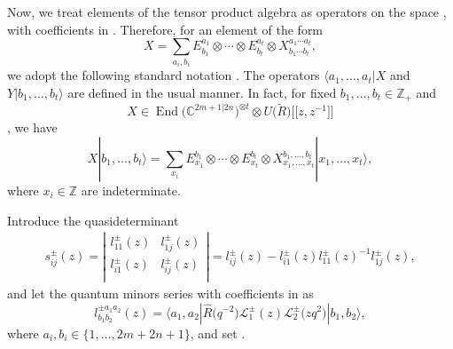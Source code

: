 \documentclass[pdftex]{sigma}
\numberwithin{equation}{section}
\begin{document}
 Now, we treat elements of the tensor product algebra
 as operators on the space , with coefficients in .
Therefore, for an element of the form
\begin{equation*}
 X = \sum\limits_{a_i,b_i} E^{a_1}_{b_1} \otimes \cdots \otimes E^{a_t}_{b_t} \otimes X^{a_1 \cdots a_t}_{b_1 \cdots b_t},
\end{equation*}
we adopt the following standard notation
.
The operators $\langle a_1, \ldots, a_t | X$ and $Y | b_1, \ldots, b_t \rangle$ are defined in the usual manner.
In fact, for fixed $b_1, \ldots, b_t \in \mathbb{Z}_+$ and \[X \in \operatorname{End}\bigl(\mathbb{C}^{2m+1|2n}\bigr)^{\otimes t} \otimes U\bigl(\widetilde{R}\bigr)\bigl[\bigl[z,z^{-1}\bigr]\bigr]\], we have
\begin{equation*}
 X | b_1, \ldots, b_t \rangle = \sum\limits_{x_i} E_{x_1}^{b_1} \otimes \cdots \otimes E_{x_t}^{b_t} \otimes X_{x_1, \ldots, x_t}^{b_1, \ldots, b_t} | x_1, \ldots, x_t \rangle,
\end{equation*}
where $x_i \in \mathbb{Z}$ are indeterminate.



Introduce the quasideterminant
\begin{align*}s^{\pm}_{ij}(z)=
 \left|
 \begin{matrix}
 l_{11}^{\pm}(z) & l_{1j}^{\pm}(z) \\
 l_{i1}^{\pm}(z) & \boxed{l_{ij}^{\pm}(z)} \\
 \end{matrix}
 \right|= l_{ij}^{\pm}(z)- l_{i1}^{\pm}(z) l_{11}^{\pm}(z)^{-1} l_{1j}^{\pm}(z),
\end{align*}and let the quantum minors series  with coefficients in  as
\[%
 l^{\pm a_1a_2}_{b_1b_2}(z)=\big\langle a_1, a_2|\widehat{R}\bigl(q^{-2}\bigr)\mathcal{L}_1^{\pm}(z)\mathcal{L}_2^{\pm}\bigl(zq^{2}\bigr)|b_1, b_2\big\rangle,
\]
where $a_i, b_i\in\{1,\dots,2m+2n+1\}$, and set
.
\end{document}
